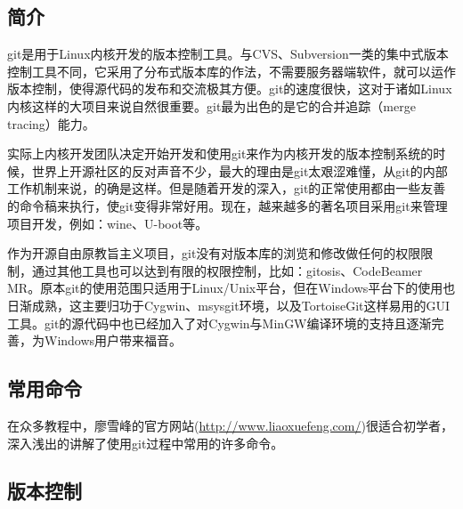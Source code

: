 	\subsection{简介}
	\par git是用于Linux内核开发的版本控制工具。与CVS、Subversion一类的集中式版本控制工具不同，它采用了分布式版本库的作法，不需要服务器端软件，就可以运作版本控制，使得源代码的发布和交流极其方便。git的速度很快，这对于诸如Linux内核这样的大项目来说自然很重要。git最为出色的是它的合并追踪（merge tracing）能力。  
	\par 实际上内核开发团队决定开始开发和使用git来作为内核开发的版本控制系统的时候，世界上开源社区的反对声音不少，最大的理由是git太艰涩难懂，从git的内部工作机制来说，的确是这样。但是随着开发的深入，git的正常使用都由一些友善的命令稿来执行，使git变得非常好用。现在，越来越多的著名项目采用git来管理项目开发，例如：wine、U-boot等。  
	\par 作为开源自由原教旨主义项目，git没有对版本库的浏览和修改做任何的权限限制，通过其他工具也可以达到有限的权限控制，比如：gitosis、CodeBeamer MR。原本git的使用范围只适用于Linux/Unix平台，但在Windows平台下的使用也日渐成熟，这主要归功于Cygwin、msysgit环境，以及TortoiseGit这样易用的GUI工具。git的源代码中也已经加入了对Cygwin与MinGW编译环境的支持且逐渐完善，为Windows用户带来福音。
	\subsection{常用命令}
	\par 在众多教程中，廖雪峰的官方网站(\href{http://www.liaoxuefeng.com/}{http://www.liaoxuefeng.com/})很适合初学者，深入浅出的讲解了使用git过程中常用的许多命令。
	\subsection{版本控制}
